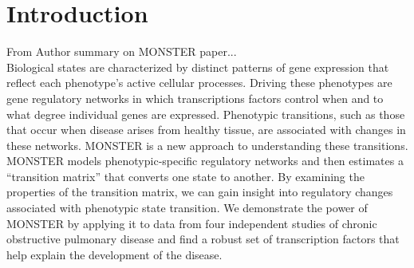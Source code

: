 \chapter{Introduction}
\label{introduction}

From Author summary on MONSTER paper...\\
Biological states are characterized by distinct patterns of gene expression that reflect each phenotype's active cellular processes. Driving these phenotypes are gene regulatory networks in which transcriptions factors control when and to what degree individual genes are expressed. Phenotypic transitions, such as those that occur when disease arises from healthy tissue, are associated with changes in these  networks. MONSTER is a new approach to understanding these transitions. MONSTER models phenotypic-specific regulatory networks and then estimates a ``transition matrix'' that converts one state to another. By examining the properties of the transition matrix, we can gain insight into regulatory changes associated with phenotypic state transition. We demonstrate the power of MONSTER by applying it to data from four independent studies of chronic obstructive pulmonary disease and find a robust set of transcription factors that help explain the development of the disease.

